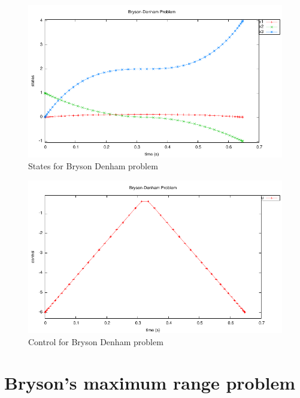 \documentclass[a4paper,11pt]{report}    %
\begin{document}
\begin{figure}
  \centering
  \includegraphics{../examples/bryden/bryden_states}
  \caption{States for Bryson Denham problem}
  \label{bryden_states}
\end{figure}


\begin{figure}
  \centering
  \includegraphics{../examples/bryden/bryden_control}
  \caption{Control for Bryson Denham problem}
  \label{bryden_control}
\end{figure}


\section{Bryson's maximum range problem}
\end{document}
